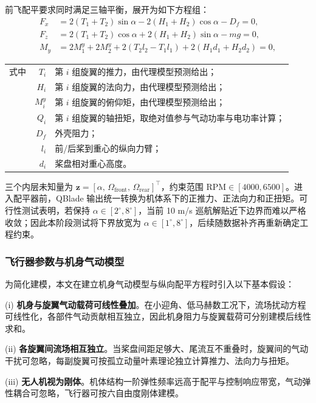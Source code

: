 前飞配平要求同时满足三轴平衡，展开为如下方程组：
\begin{align}
F_x &= 2(T_1 + T_2)\sin\alpha - 2(H_1 + H_2)\cos\alpha - D_f = 0, \\
F_z &= 2(T_1 + T_2)\cos\alpha + 2(H_1 + H_2)\sin\alpha - mg = 0, \\
M_y &= 2M_1^y + 2M_2^y + 2(T_2 l_2 - T_1 l_1) + 2(H_1 d_1 + H_2 d_2) = 0,
\end{align}
\begin{tabularx}{\textwidth}{@{}l@{\quad}r@{———}X@{}}
式中 & $T_i$     & 第 $i$ 组旋翼的推力，由代理模型预测给出；\\
     & $H_i$     & 第 $i$ 组旋翼的法向力，由代理模型预测给出；\\
     & $M_i^y$   & 第 $i$ 组旋翼的俯仰矩，由代理模型预测给出；\\
     & $Q_i$     & 第 $i$ 组旋翼的轴扭矩，取绝对值参与气动功率与电功率计算；\\
     & $D_f$     & 外壳阻力；\\
     & $l_i$     & 前/后桨到重心的纵向力臂；\\
     & $d_i$     & 桨盘相对重心高度。\\
\end{tabularx}\vspace{3.15bp}

三个内层未知量为 $\mathbf{z} = [\alpha,\, \Omega_\text{front},\, \Omega_\text{rear}]^\top$，约束范围 $\text{RPM} \in [4000, 6500]$。进入配平器前，QBlade 输出统一转换为机体系下的正推力、正法向力和正扭矩。可行性测试表明，若保持 $\alpha \in [2^\circ,8^\circ]$，当前 10 m/s 巡航解贴近下边界而难以严格收敛；因此本阶段测试将下界放宽为 $\alpha \in [1^\circ,8^\circ]$，后续随数据补齐再重新确定工程约束。

\subsubsection{飞行器参数与机身气动模型}

为简化建模，本文在建立机身气动模型与纵向配平方程时引入以下基本假设：

(i) \textbf{机身与旋翼气动载荷可线性叠加}。在小迎角、低马赫数工况下，流场扰动方程可线性化，各部件气动贡献相互独立，因此机身阻力与旋翼载荷可分别建模后线性求和。

(ii) \textbf{各旋翼间流场相互独立}。当桨盘间距足够大、尾流互不重叠时，旋翼间的气动干扰可忽略，每副旋翼可按孤立动量叶素理论独立计算推力、法向力与扭矩。

(iii) \textbf{无人机视为刚体}。机体结构一阶弹性频率远高于配平与控制响应带宽，气动弹性耦合可忽略，飞行器可按六自由度刚体建模。

